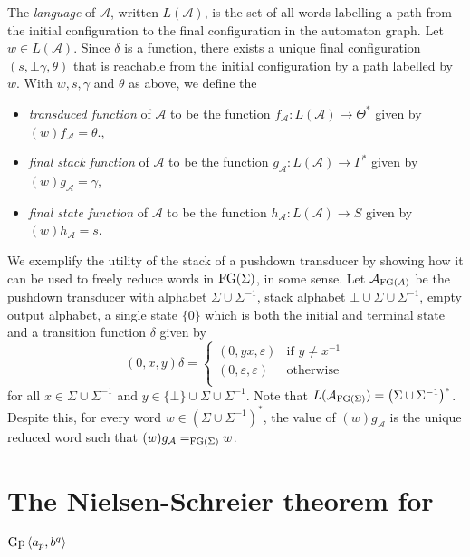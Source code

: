 The \emph{language} of $\mathcal{A}$, written $L(\mathcal{A})$, is the set of all words labelling a path from the
initial configuration to the final configuration in the automaton graph.
Let $w\in L(\mathcal{A})$. Since $\delta$ is a function, there exists a unique final configuration
$(s, \bot\gamma, \theta)$ that is reachable from the initial configuration by a path labelled
by $w$. With $w, s, \gamma$ and $\theta$ as above, we define the
\begin{itemize}
  \item \emph{transduced function} of $\mathcal{A}$ to be the function
    $f_{\mathcal{A}}: L(\mathcal{A}) \rightarrow \Theta^\ast$ given by $(w)f_{\mathcal{A}} = \theta$.,
  \item \emph{final stack function} of $\mathcal{A}$ to be the function
    $g_{\mathcal{A}}: L(\mathcal{A}) \rightarrow \Gamma^\ast$ given by $(w)g_{\mathcal{A}} = \gamma$,
  \item \emph{final state function} of $\mathcal{A}$ to be the function
    $h_{\mathcal{A}}: L(\mathcal{A}) \rightarrow S$ given by $(w)h_{\mathcal{A}} = s$.
\end{itemize}

We exemplify the utility of the stack of a pushdown transducer by showing how it can be used to freely reduce words
in $\textrm{FG}(\Sigma)$, in some sense. Let $\mathcal{A}_{\textrm{FG}(A)}$ be the pushdown transducer with
alphabet $\Sigma \cup \Sigma^{-1}$, stack alphabet $\bot \cup \Sigma \cup \Sigma^{-1}$,
empty output alphabet, a single state $\{0\}$ which is both the initial and terminal state and a transition function
$\delta$ given by
\[
  (0, x, y)\delta = \begin{cases}
    (0, yx, \varepsilon) & \textrm{if }y\neq x^{-1}\\
    (0, \varepsilon, \varepsilon) & \textrm{otherwise}\\
  \end{cases}
\]
for all $x\in \Sigma \cup \Sigma^{-1}$ and $y\in \{\bot\} \cup \Sigma \cup \Sigma^{-1}$.
Note that $L(\mathcal{A}_{\textrm{FG}(\Sigma)}) = {\left(\Sigma \cup \Sigma^{-1}\right)}^\ast$.
Despite this, for every word $w\in {\left(\Sigma \cup \Sigma^{-1}\right)}^\ast$,
the value of $(w)g_{\mathcal{A}}$ is the unique reduced word such that
$(w)g_{\mathcal{A}} =_{\textrm{FG}(\Sigma)} w$.

\section{The Nielsen-Schreier theorem for $\textrm{Gp}\left\langle a_p, b^q \right\rangle$}

